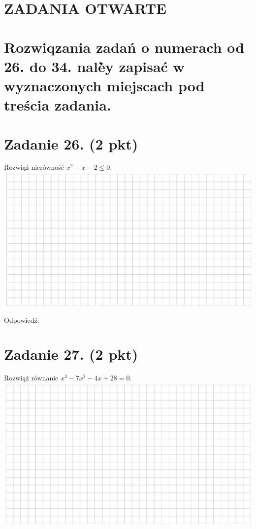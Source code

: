 \documentclass[10pt]{article}
\begin{document}
\section*{ZADANIA OTWARTE}
\section*{Rozwiqzania zadań o numerach od 26. do 34. nalė̇̀y zapisać \(\boldsymbol{w}\) wyznaczonych miejscach pod treścia zadania.}
\section*{Zadanie 26. (2 pkt)}
Rozwiąż nierówność \(x^{2}-x-2 \leq 0\).\\
\includegraphics[max width=\textwidth, center]{2024_11_21_caf6b2e64dd65c9b24eeg-10(1)}

Odpowiedź:

\section*{Zadanie 27. (2 pkt)}
Rozwiąż równanie \(x^{3}-7 x^{2}-4 x+28=0\).\\
\includegraphics[max width=\textwidth, center]{2024_11_21_caf6b2e64dd65c9b24eeg-10}
\end{document}
